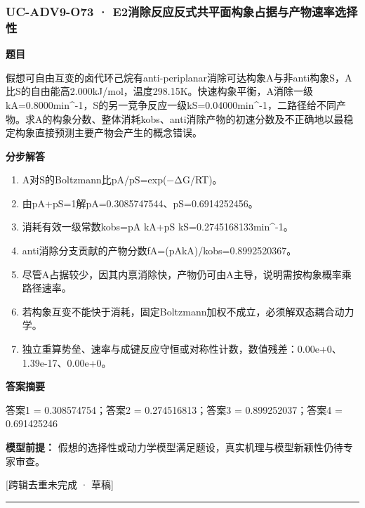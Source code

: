 \documentclass[UTF8,11pt,a4paper]{ctexart}
\begin{document}
\subsubsection*{UC-ADV9-O73 · E2消除反应反式共平面构象占据与产物速率选择性}
\noindent\textbf{题目}\par
假想可自由互变的卤代环己烷有anti-periplanar消除可达构象A与非anti构象S，A比S的自由能高2.000kJ/mol，温度298.15K。快速构象平衡，A消除一级kA=0.8000min\textasciicircum{}-1，S的另一竞争反应一级kS=0.04000min\textasciicircum{}-1，二路径给不同产物。求A的构象分数、整体消耗kobs、anti消除产物的初速分数及不正确地以最稳定构象直接预测主要产物会产生的概念错误。\par
\medskip\noindent\textbf{分步解答}
\begin{enumerate}
\item A对S的Boltzmann比pA/pS=exp(−ΔG/RT)。
\item 由pA+pS=1解pA=0.3085747544、pS=0.6914252456。
\item 消耗有效一级常数kobs=pA kA+pS kS=0.2745168133min\textasciicircum{}-1。
\item anti消除分支贡献的产物分数fA=(pAkA)/kobs=0.8992520367。
\item 尽管A占据较少，因其内禀消除快，产物仍可由A主导，说明需按构象概率乘路径速率。
\item 若构象互变不能快于消耗，固定Boltzmann加权不成立，必须解双态耦合动力学。
\item 独立重算势垒、速率与成键反应守恒或对称性计数，数值残差：0.00e+0、1.39e-17、0.00e+0。
\end{enumerate}
\noindent\textbf{答案摘要}\par
答案1 = 0.308574754；答案2 = 0.274516813；答案3 = 0.899252037；答案4 = 0.691425246\par
\noindent\textbf{模型前提：}
假想的选择性或动力学模型满足题设，真实机理与模型新颖性仍待专家审查。\par
\noindent\textcolor{red!65!black}{[跨辑去重未完成 · 草稿]} \par
\medskip\hrule\medskip
{}
\end{document}
